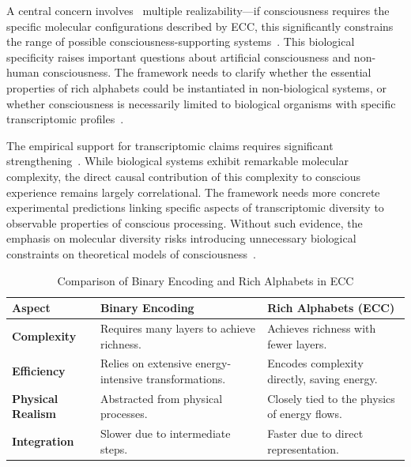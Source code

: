A central concern involves~ multiple realizability—if consciousness requires the specific molecular configurations described by ECC, this significantly constrains the range of possible consciousness-supporting systems~\cite{block2009comparing, pigliucci2013philosophy}. This biological specificity raises important questions about artificial consciousness and non-human consciousness. The framework needs to clarify whether the essential properties of rich alphabets could be instantiated in non-biological systems, or whether consciousness is necessarily limited to biological organisms with specific transcriptomic profiles~\cite{chalmers2010character, thompson2014waking}.

The empirical support for transcriptomic claims requires significant strengthening~\cite{bosl2025dynamical, pinotsis2023vivo}. While biological systems exhibit remarkable molecular complexity, the direct causal contribution of this complexity to conscious experience remains largely correlational. The framework needs more concrete experimental predictions linking specific aspects of transcriptomic diversity to observable properties of conscious processing. Without such evidence, the emphasis on molecular diversity risks introducing unnecessary biological constraints on theoretical models of consciousness~\cite{seth2021being, da2024mathematical}.

\begin{table}[h!]
    \centering
    \begin{tabularx}{\textwidth}{@{}lXl@{}}
        \toprule
        \textbf{Aspect}           & \textbf{Binary Encoding}                              & \textbf{Rich Alphabets (ECC)}                \\ \midrule
        \textbf{Complexity}       & Requires many layers to achieve richness.             & Achieves richness with fewer layers.         \\
        \textbf{Efficiency}       & Relies on extensive energy-intensive transformations. & Encodes complexity directly, saving energy.  \\
        \textbf{Physical Realism} & Abstracted from physical processes.                   & Closely tied to the physics of energy flows. \\
        \textbf{Integration}      & Slower due to intermediate steps.                     & Faster due to direct representation.         \\ \bottomrule
    \end{tabularx}
    \caption{Comparison of Binary Encoding and Rich Alphabets in ECC}
    \label{tab:binary_vs_rich}
\end{table}

